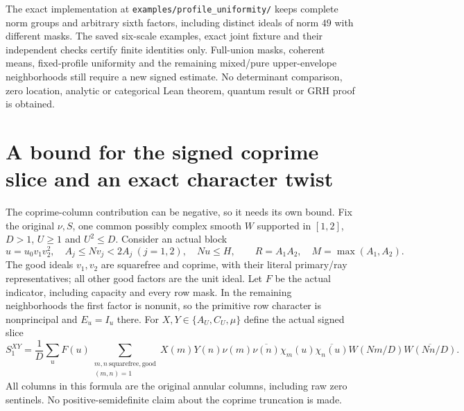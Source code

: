\documentclass[11pt]{article}
\theoremstyle{definition}\newtheorem{definition}[theorem]{Definition}
\theoremstyle{remark}\newtheorem{remark}[theorem]{Remark}
\begin{document}
The exact implementation at \texttt{examples/\allowbreak profile\_uniformity/}
keeps complete norm groups and arbitrary sixth factors, including distinct
ideals of norm $49$ with different masks. The saved six-scale examples,
exact joint fixture and their independent checks certify finite identities
only. Full-union masks, coherent means, fixed-profile uniformity and the
remaining mixed/pure upper-envelope neighborhoods still require a new
signed estimate. No determinant comparison, zero location, analytic or
categorical Lean theorem, quantum result or GRH proof is obtained.

\section{A bound for the signed coprime slice and an exact character twist}\label{sw:core}
The coprime-column contribution can be negative, so it needs its own bound.
Fix the original $\nu,S$, one common possibly complex smooth $W$ supported
in $[1,2]$, $D>1$, $U\ge1$ and $U^2\le D$. Consider an actual block
\[
 u=u_0v_1v_2^2,\quad A_j\le Nv_j<2A_j\ (j=1,2),\quad Nu\le H,
 \qquad R=A_1A_2,\quad M=\max(A_1,A_2).
\]
The good ideals $v_1,v_2$ are squarefree and coprime, with their literal
primary/ray representatives; all other good factors are the unit ideal.
Let $F$ be the actual indicator, including capacity and every row mask.
In the remaining neighborhoods the first factor is nonunit, so the
primitive row character is nonprincipal and $E_u=I_u$ there.
For $X,Y\in\{A_U,C_U,\mu\}$ define the actual signed slice
\begin{equation}\label{sw:slice}
 S_1^{XY}=\frac1D\sum_uF(u)
 \sum_{\substack{m,n\ \mathrm{squarefree,good}\\(m,n)=1}}
 X(m)Y(n)\nu(m)\overline{\nu(n)}\chi_m(u)\overline{\chi_n(u)}
 W(Nm/D)\overline{W(Nn/D)}.
\end{equation}
All columns in this formula are the original annular columns, including
raw zero sentinels. No positive-semidefinite claim about the coprime
truncation is made.
\end{document}
